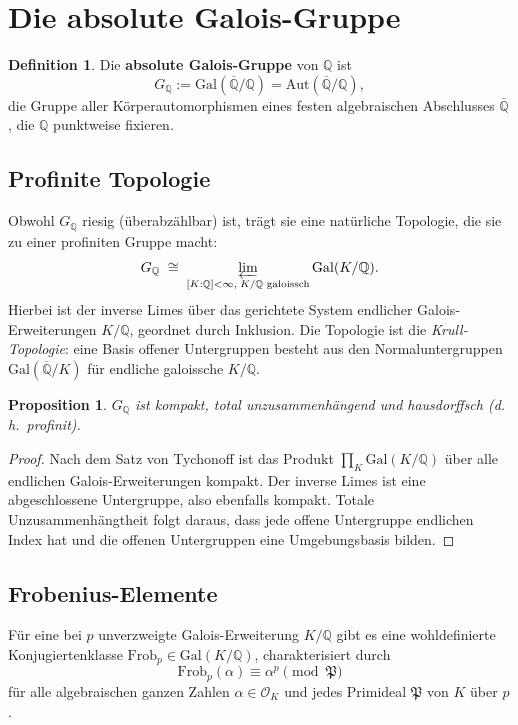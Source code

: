 \documentclass[a4paper,12pt]{amsart}
\newtheorem{proposition}[theorem]{Proposition}
\theoremstyle{definition}
\newtheorem{definition}[theorem]{Definition}
\theoremstyle{remark}
\newcommand{\Q}{\mathbb{Q}}
\newcommand{\Qbar}{\overline{\mathbb{Q}}}
\newcommand{\GQ}{\mathrm{Gal}(\overline{\mathbb{Q}}/\mathbb{Q})}
\newcommand{\Frob}{\mathrm{Frob}}
\begin{document}
\section{Die absolute Galois-Gruppe}
\label{sec:galois-gruppe}

\begin{definition}
Die \textbf{absolute Galois-Gruppe} von $\Q$ ist
\[
  G_\Q := \GQ = \mathrm{Aut}(\Qbar/\Q),
\]
die Gruppe aller Körperautomorphismen eines festen algebraischen Abschlusses $\Qbar$,
die $\Q$ punktweise fixieren.
\end{definition}

\subsection{Profinite Topologie}

Obwohl $G_\Q$ riesig (überabzählbar) ist, trägt sie eine natürliche Topologie, die
sie zu einer profiniten Gruppe macht:
\[
  G_\Q \;\cong\; \varprojlim_{[K:\Q] < \infty,\; K/\Q \text{ galoissch}} \mathrm{Gal}(K/\Q).
\]
Hierbei ist der inverse Limes über das gerichtete System endlicher Galois-Erweiterungen
$K/\Q$, geordnet durch Inklusion. Die Topologie ist die \emph{Krull-Topologie}: eine
Basis offener Untergruppen besteht aus den Normaluntergruppen $\mathrm{Gal}(\Qbar/K)$
für endliche galoissche $K/\Q$.

\begin{proposition}
$G_\Q$ ist kompakt, total unzusammenhängend und hausdorffsch (d.\,h.\ profinit).
\end{proposition}

\begin{proof}
Nach dem Satz von Tychonoff ist das Produkt $\prod_K \mathrm{Gal}(K/\Q)$ über alle
endlichen Galois-Erweiterungen kompakt. Der inverse Limes ist eine abgeschlossene
Untergruppe, also ebenfalls kompakt. Totale Unzusammenhängtheit folgt daraus, dass
jede offene Untergruppe endlichen Index hat und die offenen Untergruppen eine
Umgebungsbasis bilden.
\end{proof}

\subsection{Frobenius-Elemente}

Für eine bei $p$ unverzweigte Galois-Erweiterung $K/\Q$ gibt es eine wohldefinierte
Konjugiertenklasse $\Frob_p \in \mathrm{Gal}(K/\Q)$, charakterisiert durch
\[
  \Frob_p(\alpha) \equiv \alpha^p \pmod{\mathfrak{P}}
\]
für alle algebraischen ganzen Zahlen $\alpha \in \mathcal{O}_K$ und jedes Primideal
$\mathfrak{P}$ von $K$ über $p$.
\end{document}
